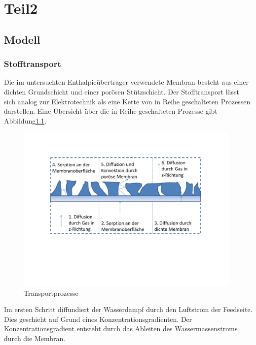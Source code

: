 \chapter{Teil2}
\label{cha:Physikalische Grundlagen}



\begin{normalsize}


\section{Modell}
\label{sec:Modell}


\subsection{Stofftransport}

Die im untersuchten Enthalpieübertrager verwendete Membran besteht aus einer dichten Grundschicht und einer porösen Stützschicht. Der Stofftransport lässt sich analog zur Elektrotechnik als eine Kette von in Reihe geschalteten Prozessen darstellen. Eine Übersicht über die in Reihe geschalteten Prozesse gibt Abbildung\ref{fig:Transportprozesse}.

\begin{figure} [h]
	\caption{Transportprozesse}
	\includegraphics[width=0.98\textwidth]{pictures/Membran_Transportprozesse.pdf}
	
	\label{fig:Transportprozesse}
\end{figure}

Im ersten Schritt diffundiert der Wasserdampf durch den Luftstrom der Feedseite. Dies geschieht auf Grund eines Konzentrationsgradienten. Der Konzentrationsgradient entsteht durch das Ableiten des Wassermassenstroms durch die Membran. 


\end{normalsize}
